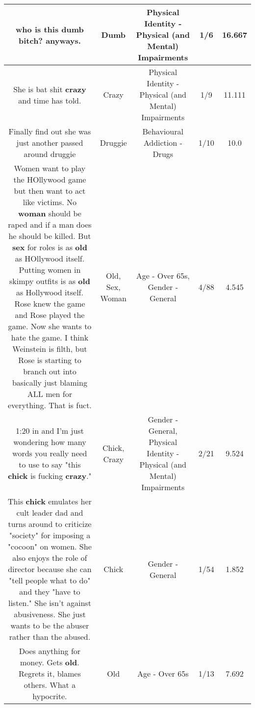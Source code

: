 \documentclass[11pt]{article}
\newlength\mylength
\begin{document}
\begin{center}
\begin{longtable}{|C{.65\mylength}|C{.30\mylength}|C{.12\mylength}|C{.12\mylength}|C{.12\mylength}|}
  \small who is this \textbf{dumb} bitch? anyways.\normalsize   & Dumb & Physical Identity - Physical (and Mental) Impairments & 1/6 & 16.667 \\  \hline
  \small She is bat shit \textbf{crazy} and time has told.\normalsize   & Crazy & Physical Identity - Physical (and Mental) Impairments & 1/9 & 11.111 \\  \hline
  \small Finally find out she was just another passed around druggie\normalsize   & Druggie & Behavioural Addiction - Drugs & 1/10 & 10.0 \\  \hline
  \small Women want to play the HOllywood game but then want to act like victims.  No \textbf{woman} should be raped and if a man does he should be killed.  But \textbf{sex} for roles is as \textbf{old} as HOllywood itself.  Putting women in skimpy outfits is as \textbf{old} as Hollywood itself.   Rose knew the game and Rose played the game.  Now she wants to hate the game.  I think Weinstein is filth, but Rose is starting to branch out into basically just blaming ALL men for everything.  That is fuct.\normalsize   & Old, Sex, Woman & Age - Over 65s, Gender - General & 4/88 & 4.545 \\  \hline
  \small 1:20 in and I'm just wondering how many words you really need to use to say "this \textbf{chick} is fucking \textbf{crazy}."\normalsize   & Chick, Crazy & Gender - General, Physical Identity - Physical (and Mental) Impairments & 2/21 & 9.524 \\  \hline
  \small This \textbf{chick} emulates her cult leader dad and turns around to criticize "society" for imposing a "cocoon" on women. She also enjoys the role of director because she can "tell people what to do" and they "have to listen." She isn't against abusiveness. She just wants to be the abuser rather than the abused.\normalsize   & Chick & Gender - General & 1/54 & 1.852 \\  \hline
  \small Does anything for money. Gets \textbf{old}. Regrets it, blames others. What a hypocrite.\normalsize   & Old & Age - Over 65s & 1/13 & 7.692 \\  \hline

\end{longtable}
\end{center}
\end{document}

